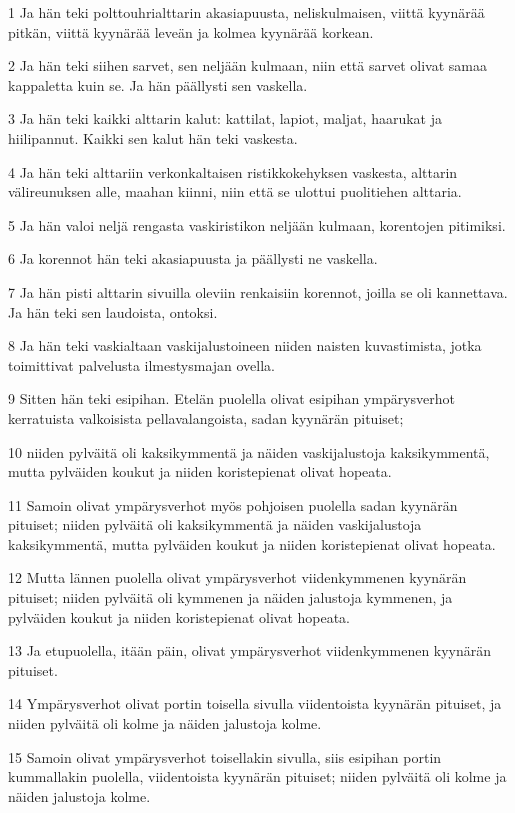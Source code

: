 \par 1 Ja hän teki polttouhrialttarin akasiapuusta, neliskulmaisen, viittä kyynärää pitkän, viittä kyynärää leveän ja kolmea kyynärää korkean.
\par 2 Ja hän teki siihen sarvet, sen neljään kulmaan, niin että sarvet olivat samaa kappaletta kuin se. Ja hän päällysti sen vaskella.
\par 3 Ja hän teki kaikki alttarin kalut: kattilat, lapiot, maljat, haarukat ja hiilipannut. Kaikki sen kalut hän teki vaskesta.
\par 4 Ja hän teki alttariin verkonkaltaisen ristikkokehyksen vaskesta, alttarin välireunuksen alle, maahan kiinni, niin että se ulottui puolitiehen alttaria.
\par 5 Ja hän valoi neljä rengasta vaskiristikon neljään kulmaan, korentojen pitimiksi.
\par 6 Ja korennot hän teki akasiapuusta ja päällysti ne vaskella.
\par 7 Ja hän pisti alttarin sivuilla oleviin renkaisiin korennot, joilla se oli kannettava. Ja hän teki sen laudoista, ontoksi.
\par 8 Ja hän teki vaskialtaan vaskijalustoineen niiden naisten kuvastimista, jotka toimittivat palvelusta ilmestysmajan ovella.
\par 9 Sitten hän teki esipihan. Etelän puolella olivat esipihan ympärysverhot kerratuista valkoisista pellavalangoista, sadan kyynärän pituiset;
\par 10 niiden pylväitä oli kaksikymmentä ja näiden vaskijalustoja kaksikymmentä, mutta pylväiden koukut ja niiden koristepienat olivat hopeata.
\par 11 Samoin olivat ympärysverhot myös pohjoisen puolella sadan kyynärän pituiset; niiden pylväitä oli kaksikymmentä ja näiden vaskijalustoja kaksikymmentä, mutta pylväiden koukut ja niiden koristepienat olivat hopeata.
\par 12 Mutta lännen puolella olivat ympärysverhot viidenkymmenen kyynärän pituiset; niiden pylväitä oli kymmenen ja näiden jalustoja kymmenen, ja pylväiden koukut ja niiden koristepienat olivat hopeata.
\par 13 Ja etupuolella, itään päin, olivat ympärysverhot viidenkymmenen kyynärän pituiset.
\par 14 Ympärysverhot olivat portin toisella sivulla viidentoista kyynärän pituiset, ja niiden pylväitä oli kolme ja näiden jalustoja kolme.
\par 15 Samoin olivat ympärysverhot toisellakin sivulla, siis esipihan portin kummallakin puolella, viidentoista kyynärän pituiset; niiden pylväitä oli kolme ja näiden jalustoja kolme.
